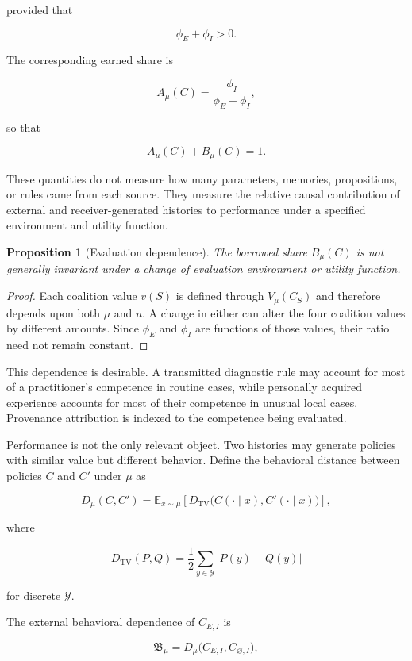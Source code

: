 \documentclass[11pt]{article}
\newtheorem{proposition}{Proposition}[section]
\begin{document}
provided that

\[
\phi_E+\phi_I>0.
\]

The corresponding earned share is

\[
A_{\mu}(C)
=
\frac{\phi_I}
{\phi_E+\phi_I},
\]

so that

\[
A_{\mu}(C)+B_{\mu}(C)=1.
\]

These quantities do not measure how many parameters, memories, propositions, or rules came from each source. They measure the relative causal contribution of external and receiver-generated histories to performance under a specified environment and utility function.

\begin{proposition}[Evaluation dependence]
The borrowed share $B_{\mu}(C)$ is not generally invariant under a change of evaluation environment or utility function.
\end{proposition}

\begin{proof}
Each coalition value $v(S)$ is defined through $V_{\mu}(C_S)$ and therefore depends upon both $\mu$ and $u$. A change in either can alter the four coalition values by different amounts. Since $\phi_E$ and $\phi_I$ are functions of those values, their ratio need not remain constant.
\end{proof}

This dependence is desirable. A transmitted diagnostic rule may account for most of a practitioner's competence in routine cases, while personally acquired experience accounts for most of their competence in unusual local cases. Provenance attribution is indexed to the competence being evaluated.

Performance is not the only relevant object. Two histories may generate policies with similar value but different behavior. Define the behavioral distance between policies $C$ and $C'$ under $\mu$ as

\[
D_{\mu}(C,C')
=
\mathbb{E}_{x\sim\mu}
\left[
D_{\mathrm{TV}}
\bigl(
C(\cdot\mid x),
C'(\cdot\mid x)
\bigr)
\right],
\]

where

\[
D_{\mathrm{TV}}(P,Q)
=
\frac{1}{2}
\sum_{y\in\mathcal{Y}}
|P(y)-Q(y)|
\]

for discrete $\mathcal{Y}$.

The external behavioral dependence of $C_{E,I}$ is

\[
\mathfrak{B}_{\mu}
=
D_{\mu}
\bigl(
C_{E,I},
C_{\varnothing,I}
\bigr),
\]
\end{document}

